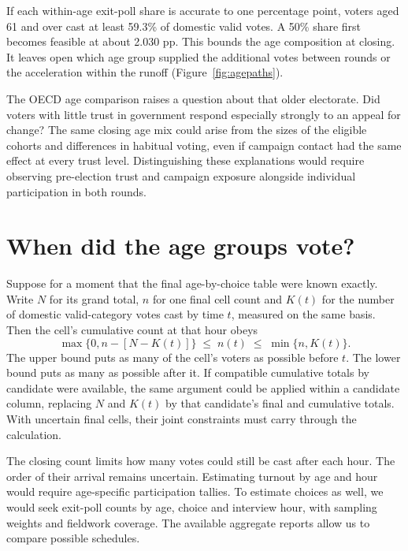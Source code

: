 \documentclass[11pt,a4paper]{article}
\begin{document}
If each within-age exit-poll share is accurate to one percentage point, voters aged 61 and over cast at least 59.3\% of domestic valid votes. A 50\% share first becomes feasible at about 2.030 pp. This bounds the age composition at closing. It leaves open which age group supplied the additional votes between rounds or the acceleration within the runoff (Figure~\ref{fig:agepaths}).

The OECD age comparison raises a question about that older electorate. Did voters with little trust in government respond especially strongly to an appeal for change? The same closing age mix could arise from the sizes of the eligible cohorts and differences in habitual voting, even if campaign contact had the same effect at every trust level. Distinguishing these explanations would require observing pre-election trust and campaign exposure alongside individual participation in both rounds.

\appendix
\section{When did the age groups vote?}\label{sup:timing}
Suppose for a moment that the final age-by-choice table were known exactly. Write $N$ for its grand total, $n$ for one final cell count and $K(t)$ for the number of domestic valid-category votes cast by time $t$, measured on the same basis. Then the cell's cumulative count at that hour obeys
\[
 \max\{0,n-[N-K(t)]\}\;\le\; n(t)\;\le\;\min\{n,K(t)\}.
\]
The upper bound puts as many of the cell's voters as possible before $t$. The lower bound puts as many as possible after it. If compatible cumulative totals by candidate were available, the same argument could be applied within a candidate column, replacing $N$ and $K(t)$ by that candidate's final and cumulative totals. With uncertain final cells, their joint constraints must carry through the calculation.

The closing count limits how many votes could still be cast after each hour. The order of their arrival remains uncertain. Estimating turnout by age and hour would require age-specific participation tallies. To estimate choices as well, we would seek exit-poll counts by age, choice and interview hour, with sampling weights and fieldwork coverage. The available aggregate reports allow us to compare possible schedules.
\end{document}
